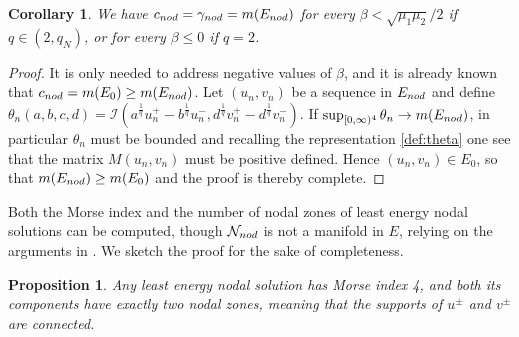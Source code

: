 \documentclass[10pt,a4paper]{amsart}
\numberwithin{equation}{section}
\newtheorem{proposition}[theo]{Proposition}
\newtheorem{corollary}[theo]{Corollary}
\begin{document}
\begin{corollary}
We have $c_{\rm nod}=\gamma_{\rm nod}= m(E_{\rm nod})$ for every
$\beta< \sqrt{\mu_1\mu_2}/2 $ if $q\in (2, q_N)$, or for every $\beta\le 0$  if $q=2$.
\end{corollary}

\begin{proof}
It is only needed to address negative values of $\beta$, and it is already known that
$c_{\rm nod}=m(E_0) \ge m(E_{\rm nod})$.
Let $(u_n,v_n)$ be a sequence in $E_{\rm nod}$ and define
$\theta_n(a,b,c,d)=\mathcal I (a^{\frac{1}q}u_n^+-b^{\frac{1}q}u_n^-,
d^{\frac{1}q}v_n^+-d^{\frac{1}q}v_n^-)$.
If $ \sup_{[0,\infty)^4} \theta_n \to m(E_{\rm nod})$, in particular
$\theta_n$ must be bounded and recalling the representation \eqref{def:theta}
one see that the matrix $M(u_n,v_n)$ must be positive defined.
Hence  $(u_n, v_n)\in E_0$, so that $m(E_{\rm nod})\ge m(E_0)$ and the proof is
thereby complete.
\end{proof}

Both the Morse index and the number of nodal zones of least energy nodal solutions can
be computed, though $\mathcal N_{\rm nod}$ is not a manifold in $E$, relying on the
arguments in \cite{BW_JDE06}.
We sketch the proof for the sake of completeness.

\begin{proposition}\label{prop:Morseindex}
Any least energy nodal solution has Morse index 4, and both its components have exactly
two nodal zones, meaning that the supports of $u^{\pm}$ and $v^{\pm}$ are connected.
\end{proposition}
\end{document}
